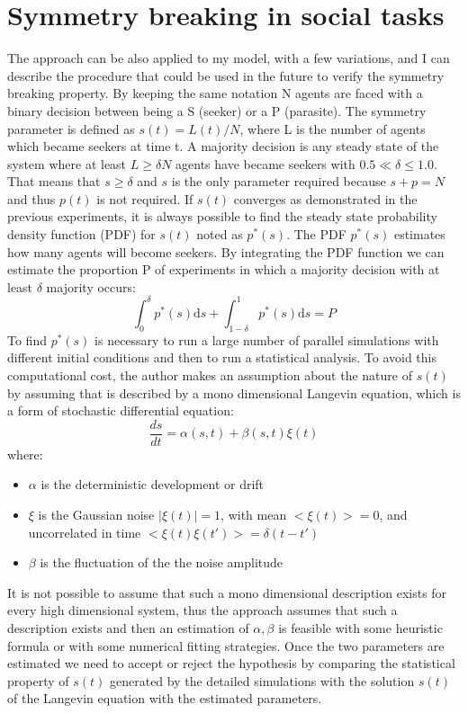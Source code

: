 
\section{Symmetry breaking in social tasks}

The approach can be also applied to my model, with a few variations, and I
 can describe the procedure that could be used in the future to verify
 the symmetry breaking property.
By keeping the same notation N agents are faced with a binary decision between
 being a S (seeker) or a P (parasite).
The symmetry parameter is defined as $s(t)=L(t)/N$, where L is the number of
agents which became seekers at time t.
A majority decision is any steady state of the system where at least $L \geq \delta N$
agents have became seekers with $0.5 \ll \delta \leq 1.0$.
That means that $s \geq \delta$ and $s$ is the only parameter required
because $s+p=N$ and thus $p(t)$ is not required.
If $s(t)$ converges as demonstrated in the previous experiments, it is always
possible to find the steady state probability density function (PDF) for $s(t)$
noted as $p^*(s)$.
The PDF $p^*(s)$ estimates how many agents will become seekers.
By integrating the PDF function we can estimate the proportion P of
experiments in which a majority decision with at least $\delta$ majority occurs:
\begin{equation}
\int_0^\delta p^*(s) \mathrm{d}s + \int_{1-\delta}^1 p^*(s) \mathrm{d}s=P
\end{equation}
To find $p^*(s)$ is necessary to run a large number of parallel simulations
with different initial conditions and then to run a statistical analysis.
To avoid this computational cost, the author \citet{Hamann2010:modelsimmetry} makes an assumption
about the nature of $s(t)$ by assuming that is described by a
mono dimensional Langevin equation, which is a form of stochastic differential
equation:
\begin{equation}
\frac{ds}{dt}=\alpha(s,t)+\beta(s,t) \xi(t)
\label{eq:langevin}
\end{equation}
where:
\begin{itemize}
 \item $\alpha$ is the deterministic development or drift
 \item $\xi$ is the Gaussian noise $|\xi(t)|=1$, with mean $<\xi(t)>=0$,
and uncorrelated in time $<\xi(t)\xi(t')>=\delta(t-t')$
 \item $\beta$ is the fluctuation of the the noise amplitude
\end{itemize}
It is not possible to assume that such a mono dimensional
description exists for every high dimensional system, thus
the approach assumes that such a description exists
and then an estimation of $\alpha,\beta$ is feasible with some heuristic formula
or with some numerical fitting strategies.
Once the two parameters are estimated we need to accept or
reject the hypothesis by comparing the statistical property of
$s(t)$ generated by the detailed simulations with the solution
$s(t)$ of the Langevin equation with the estimated parameters.

